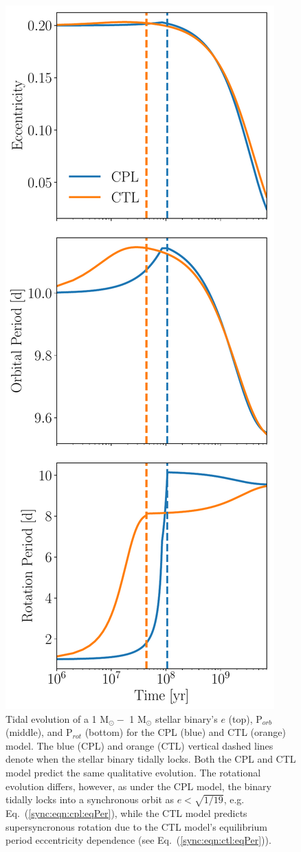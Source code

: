 \begin{figure}
	\includegraphics[scale=0.5]{tidalExample.pdf}
   \caption{Tidal evolution of a 1 M$_{\odot} -$ 1 M$_{\odot}$ stellar binary's $e$ (top), P$_{orb}$ (middle), and P$_{rot}$ (bottom) for the CPL (blue) and CTL (orange) model. The blue (CPL) and orange (CTL) vertical dashed lines denote when the stellar binary tidally locks. Both the CPL and CTL model predict the same qualitative evolution. The rotational evolution differs, however, as under the CPL model, the binary tidally locks into a synchronous orbit as $e < \sqrt{1/19}$, e.g. Eq.~(\ref{sync:eqn:cpl:eqPer}), while the CTL model predicts supersyncronous rotation due to the CTL model's equilibrium period eccentricity dependence (see Eq.~(\ref{sync:eqn:ctl:eqPer})).}%
    \label{sync:fig:tidalExample}%
\end{figure}

